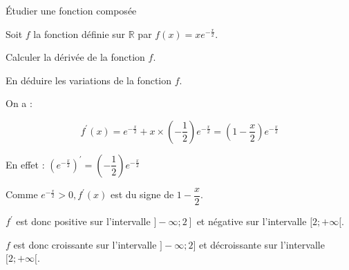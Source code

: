     \begin{bmethodet}{Étudier une fonction composée}
    	
    	Soit $f$ la fonction définie sur $\mathbb{R}$ par $f(x)=x e^{-\frac{x}{2}}$.
   		\begin{enumMet}
   			\item Calculer la dérivée de la fonction $f$.
   			\item En déduire les variations de la fonction $f$.
   		\end{enumMet}
    	
    	
    	\begin{enumMet}
    		\item On a :
    		
    		$$
    		f^{\prime}(x)=e^{-\frac{x}{2}}+x \times\left(-\dfrac{1}{2}\right) e^{-\frac{x}{2}}=\left(1-\dfrac{x}{2}\right) e^{-\frac{x}{2}}
    		$$
    		
    		
    		En effet : $\left(e^{-\frac{x}{2}}\right)^{\prime}=\left(-\dfrac{1}{2}\right) e^{-\frac{x}{2}}$
    		
    		\item Comme $e^{-\frac{x}{2}}>0, f^{\prime}(x)$ est du signe de $1-\dfrac{x}{2}$.
    		
    		$f^{\prime}$ est donc positive sur l'intervalle $\left.]-\infty ; 2\right]$ et négative sur l'intervalle $[2 ;+\infty[$.
    		
    		$f$ est donc croissante sur l'intervalle $]-\infty ; 2]$ et décroissante sur l'intervalle $[2 ;+\infty[$.
    	\end{enumMet}
    \end{bmethodet}
    
    


